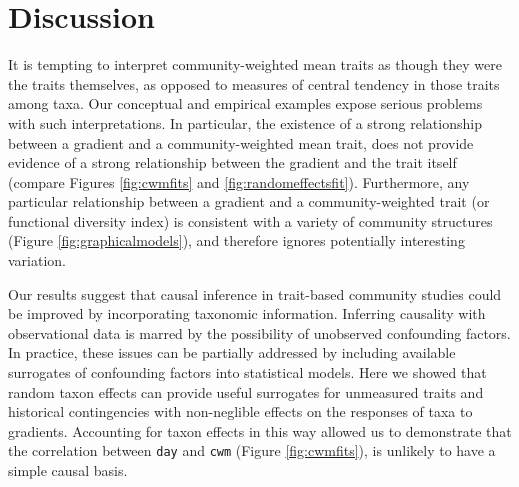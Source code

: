 \documentclass[12pt]{ecology}
\begin{document}
\section{Discussion}

It is tempting to interpret community-weighted mean traits as though they were the traits themselves, as opposed to measures of central tendency in those traits among taxa.  Our conceptual and empirical examples expose serious problems with such interpretations.  In particular, the existence of a strong relationship between a gradient and a community-weighted mean trait, does not provide evidence of a strong relationship between the gradient and the trait itself (compare Figures \ref{fig:cwmfits} and \ref{fig:randomeffectsfit}).  Furthermore, any particular relationship between a gradient and a community-weighted trait (or functional diversity index) is consistent with a variety of community structures (Figure \ref{fig:graphicalmodels}), and therefore ignores potentially interesting variation.

Our results suggest that causal inference in trait-based community studies could be improved by incorporating taxonomic information.  Inferring causality with observational data is marred by the possibility of unobserved confounding factors.  In practice, these issues can be partially addressed by including available surrogates of confounding factors into statistical models.  Here we showed that random taxon effects can provide useful surrogates for unmeasured traits and historical contingencies with non-neglible effects on the responses of taxa to gradients.  Accounting for taxon effects in this way allowed us to demonstrate that the correlation between \texttt{day} and \texttt{cwm} (Figure \ref{fig:cwmfits}), is unlikely to have a simple causal basis.  






\end{document}
